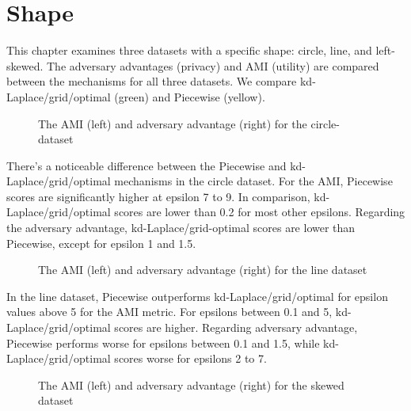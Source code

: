 {  \section{Shape}
  This chapter examines three datasets with a specific shape: circle, line, and left-skewed.
  The adversary advantages (privacy) and AMI (utility) are compared between the mechanisms for all three datasets.
  We compare kd-Laplace/grid/optimal (green) and Piecewise (yellow).
  \begin{figure}[H]
    \begin{minipage}[c]{0.55\textwidth}
    \end{minipage}
    \begin{minipage}[c]{0.55\textwidth}
    \end{minipage}
    \label{fig:advantage_circle-dataset_comparison}
    \caption{The AMI (left) and adversary advantage (right) for the circle-dataset}
  \end{figure}
  There's a noticeable difference between the Piecewise and kd-Laplace/grid/optimal mechanisms in the circle dataset. For the AMI, Piecewise scores are significantly higher at epsilon 7 to 9. In comparison, kd-Laplace/grid/optimal scores are lower than 0.2 for most other epsilons. Regarding the adversary advantage, kd-Laplace/grid-optimal scores are lower than Piecewise, except for epsilon 1 and 1.5.
  \begin{figure}[H]
    \begin{minipage}[c]{0.55\textwidth}
    \end{minipage}
    \begin{minipage}[c]{0.55\textwidth}
    \end{minipage}
    \label{fig:advantage_line-dataset_comparison}
    \caption{The AMI (left) and adversary advantage (right) for the line dataset}
  \end{figure}
  In the line dataset, Piecewise outperforms kd-Laplace/grid/optimal for epsilon values above 5 for the AMI metric. For epsilons between 0.1 and 5, kd-Laplace/grid/optimal scores are higher. Regarding adversary advantage, Piecewise performs worse for epsilons between 0.1 and 1.5, while kd-Laplace/grid/optimal scores worse for epsilons 2 to 7.
  \begin{figure}[H]
    \begin{minipage}[c]{0.55\textwidth}
    \end{minipage}
    \begin{minipage}[c]{0.55\textwidth}
    \end{minipage}
    \label{fig:advantage_skewed-dataset_comparison}
    \caption{The AMI (left) and adversary advantage (right) for the skewed dataset}


\end{figure}}
